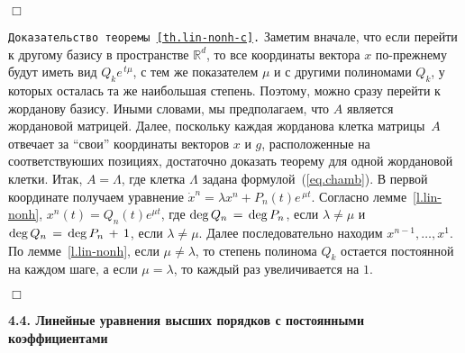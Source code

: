 \documentclass[12pt,a4paper]{article}
\newcommand{\re}{{\mathbb R}}
\begin{document}
   {\hfill $\Box$}
\medskip






{\tt Доказательство теоремы~\ref{th.lin-nonh-c}.}  Заметим вначале, что если перейти к другому базису в пространстве
$\re^d$, то все координаты вектора $x$ по-прежнему будут иметь вид $Q_k e^{\, t\mu}$, с тем же показателем $\mu$
и с другими полиномами $Q_k$, у которых осталась та же наибольшая степень. Поэтому, можно сразу перейти к жорданову базису.
Иными словами, мы предполагаем, что $A$ является жордановой матрицей. Далее, поскольку каждая жорданова клетка матрицы~$A$
отвечает за ``свои'' координаты векторов  $x$ и $g$, расположенные на соответствуюших позициях,
достаточно доказать теорему для одной жордановой клетки. Итак, $A = \Lambda$, где клетка $\Lambda$ задана
формулой~(\ref{eq.chamb}). В первой координате получаем уравнение $\dot x^n = \lambda x^n  + P_n(t) e^{\, \mu t}$.
Согласно лемме~\ref{l.lin-nonh},  $x^n (t) = Q_n(t)e^{\mu t}$, где
${\rm deg}\, Q_n \, = \, {\rm deg}\,  P_n$, если $\lambda \ne \mu$ и ${\rm deg}\, Q_n \, = \, {\rm \deg} \,  P_n\, + \, 1$, если $\lambda \ne \mu$.
Далее последовательно находим $x^{n-1}, \ldots , x^1$. По лемме~\ref{l.lin-nonh}, если $\mu \ne \lambda$, то степень полинома $Q_k$ остается постоянной на каждом шаге, а если $\mu = \lambda$, то  каждый раз  увеличивается на $1$.


   {\hfill $\Box$}
\medskip

\medskip

\begin{center}
\textbf{4.4. Линейные уравнения высших порядков с постоянными коэффициентами}
\end{center}
\smallskip
\end{document}

